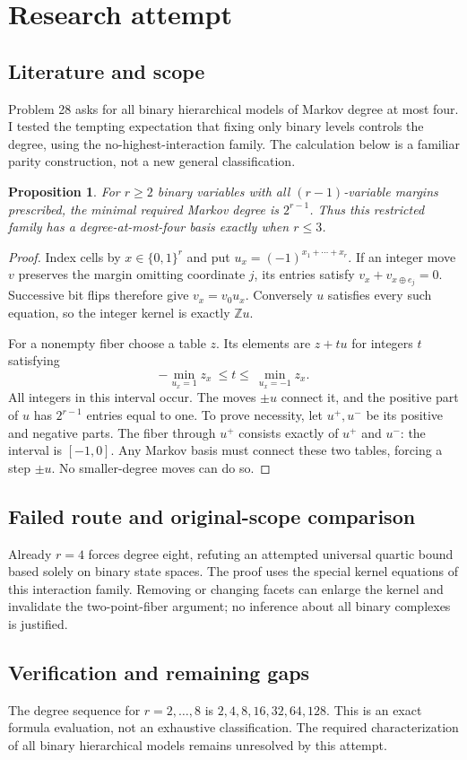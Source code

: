 \documentclass[11pt]{article}
\newtheorem{proposition}{Proposition}
\begin{document}
\section{Research attempt}
\subsection{Literature and scope}
Problem 28 asks for all binary hierarchical models of Markov degree at most four. I tested the tempting expectation that fixing only binary levels controls the degree, using the no-highest-interaction family. The calculation below is a familiar parity construction, not a new general classification.
\begin{proposition}
For $r\ge2$ binary variables with all $(r-1)$-variable margins prescribed, the minimal required Markov degree is $2^{r-1}$. Thus this restricted family has a degree-at-most-four basis exactly when $r\le3$.
\end{proposition}
\begin{proof}
Index cells by $x\in\{0,1\}^r$ and put $u_x=(-1)^{x_1+\cdots+x_r}$. If an integer move $v$ preserves the margin omitting coordinate $j$, its entries satisfy $v_x+v_{x\oplus e_j}=0$. Successive bit flips therefore give $v_x=v_0u_x$. Conversely $u$ satisfies every such equation, so the integer kernel is exactly $\mathbb Z u$.

For a nonempty fiber choose a table $z$. Its elements are $z+tu$ for integers $t$ satisfying
\[
-\min_{u_x=1}z_x\ \le t\le\ \min_{u_x=-1}z_x.
\]
All integers in this interval occur. The moves $\pm u$ connect it, and the positive part of $u$ has $2^{r-1}$ entries equal to one. To prove necessity, let $u^+,u^-$ be its positive and negative parts. The fiber through $u^+$ consists exactly of $u^+$ and $u^-$: the interval is $[-1,0]$. Any Markov basis must connect these two tables, forcing a step $\pm u$. No smaller-degree moves can do so.
\end{proof}
\subsection{Failed route and original-scope comparison}
Already $r=4$ forces degree eight, refuting an attempted universal quartic bound based solely on binary state spaces. The proof uses the special kernel equations of this interaction family. Removing or changing facets can enlarge the kernel and invalidate the two-point-fiber argument; no inference about all binary complexes is justified.
\subsection{Verification and remaining gaps}
The degree sequence for $r=2,\ldots,8$ is $2,4,8,16,32,64,128$. This is an exact formula evaluation, not an exhaustive classification. The required characterization of all binary hierarchical models remains unresolved by this attempt.
\end{document}
